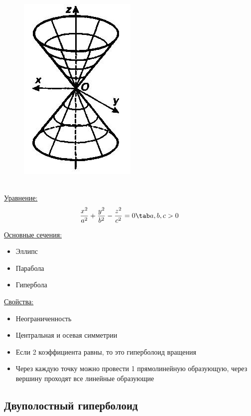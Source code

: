 \begin{figure}
    \includegraphics[width=0.5\linewidth]{images/конус.jpg}
\end{figure}

\tab\\

\underline{Уравнение:}
\[
\dfrac{x^2}{a^2} + \dfrac{y^2}{b^2} - \dfrac{z^2}{c^2} = 0 \tab a, b, c > 0
\]

\underline{Основные сечения:}
\begin{itemize}
    \item Эллипс
    \item Парабола
    \item Гипербола
\end{itemize}
\clearpage
\underline{Свойства:}
\begin{itemize}
    \item Неограниченность
    \item Центральная и осевая симметрии
    \item Если 2 коэффициента равны, то это гиперболоид вращения
    \item Через каждую точку можно провести 1 прямолинейную образующую, через вершину проходят все линейные образующие
\end{itemize}

\subsection{Двуполостный гиперболоид}

